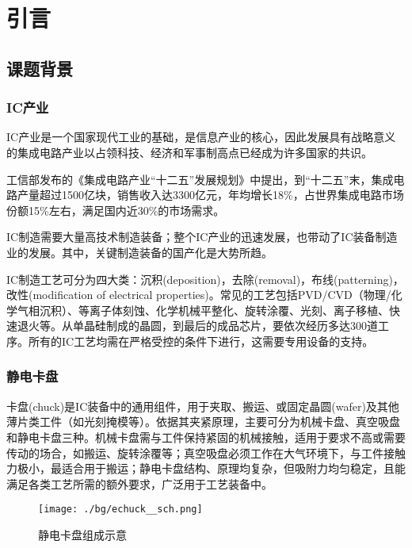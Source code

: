 \cleardoublepage
\chapter{引言}\label{ch:bg}



\section{课题背景}



\subsection{IC产业}

IC产业是一个国家现代工业的基础，是信息产业的核心，因此发展具有战略意义的集成电路产业以占领科技、经济和军事制高点已经成为许多国家的共识。

工信部发布的《集成电路产业“十二五”发展规划》中提出，到“十二五”末，集成电路产量超过1500亿块，销售收入达3300亿元，年均增长18\%，占世界集成电路市场份额15\%左右，满足国内近30\%的市场需求。

IC制造需要大量高技术制造装备；整个IC产业的迅速发展，也带动了IC装备制造业的发展。其中，关键制造装备的国产化是大势所趋。

IC制造工艺可分为四大类：沉积(deposition)，去除(removal)，布线(patterning)，改性(modification of electrical properties)。常见的工艺包括PVD/CVD（物理/化学气相沉积）、等离子体刻蚀、化学机械平整化、旋转涂覆、光刻、离子移植、快速退火等。从单晶硅制成的晶圆，到最后的成品芯片，要依次经历多达300道工序。所有的IC工艺均需在严格受控的条件下进行，这需要专用设备的支持。


\subsection{静电卡盘}\label{sec:intro-echuck}

卡盘(chuck)是IC装备中的通用组件，用于夹取、搬运、或固定晶圆(wafer)及其他薄片类工件（如光刻掩模等）。依据其夹紧原理，主要可分为机械卡盘、真空吸盘和静电卡盘三种。机械卡盘需与工件保持紧固的机械接触，适用于要求不高或需要传动的场合，如搬运、旋转涂覆等；真空吸盘必须工作在大气环境下，与工件接触力极小，最适合用于搬运；静电卡盘结构、原理均复杂，但吸附力均匀稳定，且能满足各类工艺所需的额外要求，广泛用于工艺装备中。

\begin{figure}[hbt]
\centering
\texttt{[image: ./bg/echuck\_\_sch.png]}
\caption{静电卡盘组成示意}
\label{fig:echuck__sch}
\end{figure}

